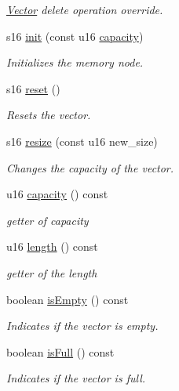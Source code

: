 \begin{DoxyCompactItemize}
\begin{DoxyCompactList}\small\item\em \hyperlink{class_vector}{Vector} delete operation override. \end{DoxyCompactList}\item 
s16 \hyperlink{class_vector_a9b081b05b56862b5d5918beabe732c54}{init} (const u16 \hyperlink{class_vector_a8f7d8bd11c88b8373e10fd1650ec17fb}{capacity})
\begin{DoxyCompactList}\small\item\em Initializes the memory node. \end{DoxyCompactList}\item 
s16 \hyperlink{class_vector_abdb3654bb23bc4f7bd0158a3a30a1019}{reset} ()
\begin{DoxyCompactList}\small\item\em Resets the vector. \end{DoxyCompactList}\item 
s16 \hyperlink{class_vector_a3477707e55ad541292ae26b1c8645819}{resize} (const u16 new\+\_\+size)
\begin{DoxyCompactList}\small\item\em Changes the capacity of the vector. \end{DoxyCompactList}\item 
u16 \hyperlink{class_vector_a8f7d8bd11c88b8373e10fd1650ec17fb}{capacity} () const
\begin{DoxyCompactList}\small\item\em getter of capacity \end{DoxyCompactList}\item 
u16 \hyperlink{class_vector_a3326a8116d10d5d302b5ae8f4794fbb8}{length} () const
\begin{DoxyCompactList}\small\item\em getter of the length \end{DoxyCompactList}\item 
boolean \hyperlink{class_vector_a390f85b3efa89070994f43b6570c909e}{is\+Empty} () const
\begin{DoxyCompactList}\small\item\em Indicates if the vector is empty. \end{DoxyCompactList}\item 
boolean \hyperlink{class_vector_ab9bedff9bd3c3826d7f2fa9a78116c9d}{is\+Full} () const
\begin{DoxyCompactList}\small\item\em Indicates if the vector is full. \end{DoxyCompactList}\item 

\end{DoxyCompactItemize}
